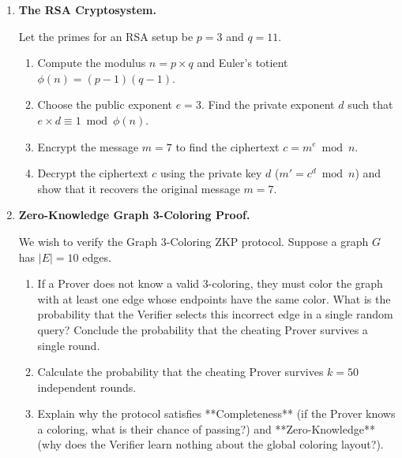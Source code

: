 \documentclass[12pt, a4paper]{book}
\begin{document}
\begin{problembox}
\begin{enumerate}[label=\textbf{P\arabic*.}]
  \item \textbf{The RSA Cryptosystem.}
  
        Let the primes for an RSA setup be $p = 3$ and $q = 11$.
        \begin{enumerate}[label=(\alph*)]
          \item Compute the modulus $n = p \times q$ and Euler's totient $\phi(n) = (p-1)(q-1)$.
          \item Choose the public exponent $e = 3$. Find the private exponent $d$ such that $e \times d \equiv 1 \bmod \phi(n)$.
          \item Encrypt the message $m = 7$ to find the ciphertext $c = m^e \bmod n$.
          \item Decrypt the ciphertext $c$ using the private key $d$ ($m' = c^d \bmod n$) and show that it recovers the original message $m = 7$.
        \end{enumerate}

  \item \textbf{Zero-Knowledge Graph 3-Coloring Proof.}
  
        We wish to verify the Graph 3-Coloring ZKP protocol.
        Suppose a graph $G$ has $|E| = 10$ edges.
        \begin{enumerate}[label=(\alph*)]
          \item If a Prover does not know a valid 3-coloring, they must color the graph with at least one edge whose endpoints have the same color.
                What is the probability that the Verifier selects this incorrect edge in a single random query?
                Conclude the probability that the cheating Prover survives a single round.
          \item Calculate the probability that the cheating Prover survives $k = 50$ independent rounds.
          \item Explain why the protocol satisfies **Completeness** (if the Prover knows a coloring, what is their chance of passing?) and **Zero-Knowledge** (why does the Verifier learn nothing about the global coloring layout?).
        \end{enumerate}
\end{enumerate}
\end{problembox}

\newpage

\end{document}

